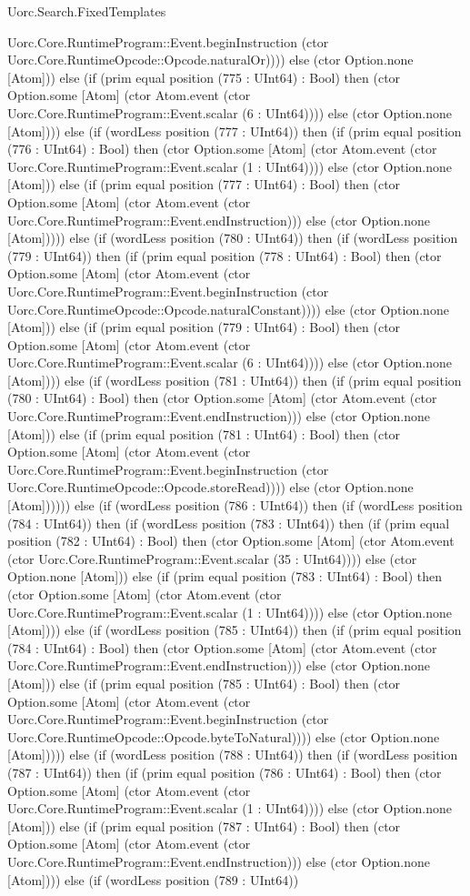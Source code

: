 \begin{lexlean}{Uorc.Search.FixedTemplates}
\begin{semanticmodule}
{Uorc.Core.RuntimeProgram::Event.beginInstruction (ctor Uorc.Core.RuntimeOpcode::Opcode.naturalOr)))) else (ctor Option.none [Atom])) else (if (prim equal position (775 : UInt64) : Bool) then (ctor Option.some [Atom] (ctor Atom.event (ctor Uorc.Core.RuntimeProgram::Event.scalar (6 : UInt64)))) else (ctor Option.none [Atom]))) else (if (wordLess position (777 : UInt64)) then (if (prim equal position (776 : UInt64) : Bool) then (ctor Option.some [Atom] (ctor Atom.event (ctor Uorc.Core.RuntimeProgram::Event.scalar (1 : UInt64)))) else (ctor Option.none [Atom])) else (if (prim equal position (777 : UInt64) : Bool) then (ctor Option.some [Atom] (ctor Atom.event (ctor Uorc.Core.RuntimeProgram::Event.endInstruction))) else (ctor Option.none [Atom])))) else (if (wordLess position (780 : UInt64)) then (if (wordLess position (779 : UInt64)) then (if (prim equal position (778 : UInt64) : Bool) then (ctor Option.some [Atom] (ctor Atom.event (ctor Uorc.Core.RuntimeProgram::Event.beginInstruction (ctor Uorc.Core.RuntimeOpcode::Opcode.naturalConstant)))) else (ctor Option.none [Atom])) else (if (prim equal position (779 : UInt64) : Bool) then (ctor Option.some [Atom] (ctor Atom.event (ctor Uorc.Core.RuntimeProgram::Event.scalar (6 : UInt64)))) else (ctor Option.none [Atom]))) else (if (wordLess position (781 : UInt64)) then (if (prim equal position (780 : UInt64) : Bool) then (ctor Option.some [Atom] (ctor Atom.event (ctor Uorc.Core.RuntimeProgram::Event.endInstruction))) else (ctor Option.none [Atom])) else (if (prim equal position (781 : UInt64) : Bool) then (ctor Option.some [Atom] (ctor Atom.event (ctor Uorc.Core.RuntimeProgram::Event.beginInstruction (ctor Uorc.Core.RuntimeOpcode::Opcode.storeRead)))) else (ctor Option.none [Atom]))))) else (if (wordLess position (786 : UInt64)) then (if (wordLess position (784 : UInt64)) then (if (wordLess position (783 : UInt64)) then (if (prim equal position (782 : UInt64) : Bool) then (ctor Option.some [Atom] (ctor Atom.event (ctor Uorc.Core.RuntimeProgram::Event.scalar (35 : UInt64)))) else (ctor Option.none [Atom])) else (if (prim equal position (783 : UInt64) : Bool) then (ctor Option.some [Atom] (ctor Atom.event (ctor Uorc.Core.RuntimeProgram::Event.scalar (1 : UInt64)))) else (ctor Option.none [Atom]))) else (if (wordLess position (785 : UInt64)) then (if (prim equal position (784 : UInt64) : Bool) then (ctor Option.some [Atom] (ctor Atom.event (ctor Uorc.Core.RuntimeProgram::Event.endInstruction))) else (ctor Option.none [Atom])) else (if (prim equal position (785 : UInt64) : Bool) then (ctor Option.some [Atom] (ctor Atom.event (ctor Uorc.Core.RuntimeProgram::Event.beginInstruction (ctor Uorc.Core.RuntimeOpcode::Opcode.byteToNatural)))) else (ctor Option.none [Atom])))) else (if (wordLess position (788 : UInt64)) then (if (wordLess position (787 : UInt64)) then (if (prim equal position (786 : UInt64) : Bool) then (ctor Option.some [Atom] (ctor Atom.event (ctor Uorc.Core.RuntimeProgram::Event.scalar (1 : UInt64)))) else (ctor Option.none [Atom])) else (if (prim equal position (787 : UInt64) : Bool) then (ctor Option.some [Atom] (ctor Atom.event (ctor Uorc.Core.RuntimeProgram::Event.endInstruction))) else (ctor Option.none [Atom]))) else (if (wordLess position (789 : UInt64)) }
\end{semanticmodule}
\end{lexlean}
